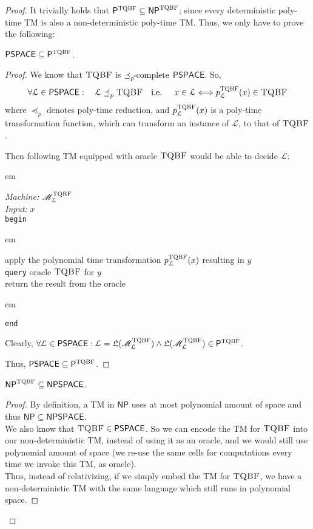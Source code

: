 \documentclass[usletter]{article}
\newcommand {\langset}[1]      {\ensuremath{\mathcal{#1}}}
\newcommand {\machine}[1]      {\ensuremath{\mathscr{#1}}}
\newcommand {\langfunc}        {\ensuremath{\mathfrak{L}}}
\newcommand {\namedlangset}[1] {\ensuremath{\textnormal{\textsc{#1}}}}
\newcommand {\family}[1]       {\ensuremath{\mathsf{#1}}}
\newcommand {\reduce}[2]    {\ensuremath{\preceq_{#1}^{#2}}}
\newcommand {\complete}[2]  {\ensuremath{\reduce{#1}{#2}     %
                                         \hspace*{-4pt}\textnormal{-complete}}}
\newcommand {\indpar}[1]   {
  \par\leftskip=#1em
  \noindent\ignorespaces
}
\newenvironment{turing}[2] {
  \smallskip
  \indpar{2}
  \textit{Machine:} #1\\
  \textit{Input:} $#2$\\[5pt]
  \texttt{begin}
  \parskip=0pt
  \indpar{3}
}{
  \indpar{2}
  \texttt{end}
  \par\medskip
}
\newcommand{\ie}{\textnormal{i.e. }}
\newcommand {\langL}          {\langset{L}}
\newcommand {\machineM}       {\machine{M}}
\begin{document}
\begin{enumerate}[labelsep=2.5em, label=\textbf{\arabic{enumi}}]
\begin{proof}
    It trivially holds that
    $\family{P}^\namedlangset{TQBF} \subseteq \family{NP}^\namedlangset{TQBF}$;
    since every deterministic poly-time TM is also a non-deterministic poly-time
    TM. Thus, we only have to prove the following:

    \begin{claim}
      $ \family{PSPACE} \subseteq \family{P}^\namedlangset{TQBF} $.
    \end{claim}
    \begin{proof}
      We know that \namedlangset{TQBF} is \complete{p}{} \family{PSPACE}. So,
      $$
      \forall \langL \in \family{PSPACE} : \quad
      \langL \reduce{p}{} \namedlangset{TQBF} \quad \ie \quad
        x \in \langL \Longleftrightarrow p_\langL^\namedlangset{TQBF} (x)
                                         \in \namedlangset{TQBF}
      $$
      where \reduce{p}{} denotes poly-time reduction, and
      $p_\langL^\namedlangset{TQBF} (x)$ is a poly-time transformation function,
      which can transform an instance of \langL, to that of \namedlangset{TQBF}.

      Then following TM equipped with oracle \namedlangset{TQBF} would be able
      to decide \langL:
      \begin{turing}{$\machineM_\langL^\namedlangset{TQBF}$}{x}
        apply the polynomial time transformation
          $p_\langL^\namedlangset{TQBF}(x)$ resulting in $y$ \\
        \texttt{query} oracle \namedlangset{TQBF} for $y$ \\
        return the result from the oracle
      \end{turing}
      Clearly,
      $\forall \langL \in \family{PSPACE} :
        \langL = \langfunc(\machineM_\langL^\namedlangset{TQBF})
        \wedge \langfunc(\machineM_\langL^\namedlangset{TQBF})
          \in \family{P}^\namedlangset{TQBF}$.

      Thus, $\family{PSPACE} \subseteq \family{P}^\namedlangset{TQBF}$.
    \end{proof}

    \begin{claim}
      $ \family{NP}^\namedlangset{TQBF} \subseteq \family{NPSPACE} $.
    \end{claim}
    \begin{proof}
      By definition, a TM in \family{NP} uses at most polynomial amount of space
      and thus $\family{NP} \subseteq \family{NPSPACE}$. \\
      We also know that $\namedlangset{TQBF} \in \family{PSPACE}$. So we can
      encode the TM for \namedlangset{TQBF} into our non-deterministic TM,
      instead of using it as an oracle, and we would still use polynomial amount
      of space (we re-use the same cells for computations every time we invoke
      this TM, as oracle). \\
      Thus, instead of relativizing, if we simply embed the TM for
      \namedlangset{TQBF}, we have a non-deterministic TM with the same language
      which still runs in polynomial space.
    \end{proof}


\end{proof}
\end{enumerate}
\end{document}
